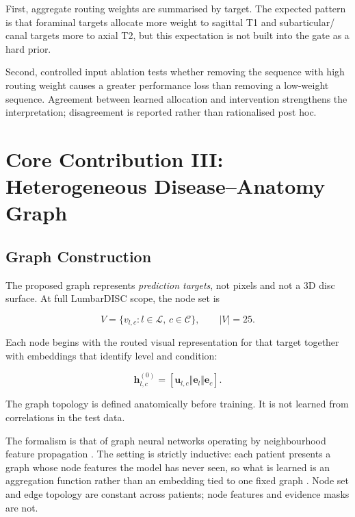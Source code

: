 First, aggregate routing weights are summarised by target. The expected pattern
is that foraminal targets allocate more weight to sagittal T1 and subarticular/
canal targets more to axial T2, but this expectation is not built into the gate
as a hard prior.

Second, controlled input ablation tests whether removing the sequence with high
routing weight causes a greater performance loss than removing a low-weight
sequence. Agreement between learned allocation and intervention strengthens the
interpretation; disagreement is reported rather than rationalised post hoc.

\section{Core Contribution III: Heterogeneous Disease--Anatomy Graph}
\label{sec:method-graph}

\subsection{Graph Construction}
\label{sec:method-graph-construction}

The proposed graph represents \emph{prediction targets}, not pixels and not a
3D disc surface. At full LumbarDISC scope, the node set is

\begin{equation}
V=\{v_{l,c}:l\in\mathcal{L},\,c\in\mathcal{C}\},
\qquad |V|=25.
\label{eq:graph-nodes}
\end{equation}

Each node begins with the routed visual representation for that target together
with embeddings that identify level and condition:

\begin{equation}
\mathbf{h}^{(0)}_{l,c}
=
[
\mathbf{u}_{l,c}
\Vert
\mathbf{e}_{l}
\Vert
\mathbf{e}_{c}
].
\label{eq:node-initial}
\end{equation}

The graph topology is defined anatomically before training. It is not learned
from correlations in the test data.

The formalism is that of graph neural networks operating by neighbourhood
feature propagation \cite{kipf2017semisupervised}. The setting is strictly
inductive: each patient presents a graph whose node features the model has never
seen, so what is learned is an aggregation function rather than an embedding
tied to one fixed graph \cite{hamilton2017inductive}. Node set and edge
topology are constant across patients; node features and evidence masks are
not.

